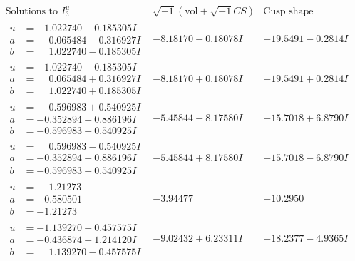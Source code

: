 \documentclass[1p]{elsarticle_modified}
\theoremstyle{definition}
\newcommand{\I}{\sqrt{-1}}
\begin{document}
$$\begin{array}{c|c|c}  
\text{Solutions to }I^u_{3}& \I (\text{vol} + \sqrt{-1}CS) & \text{Cusp shape}\\
 \hline 
\begin{aligned}
u &= -1.022740 + 0.185305 I \\
a &= \phantom{-}0.065484 - 0.316927 I \\
b &= \phantom{-}1.022740 - 0.185305 I\end{aligned}
 & -8.18170 - 0.18078 I & -19.5491 - 0.2814 I \\ \hline\begin{aligned}
u &= -1.022740 - 0.185305 I \\
a &= \phantom{-}0.065484 + 0.316927 I \\
b &= \phantom{-}1.022740 + 0.185305 I\end{aligned}
 & -8.18170 + 0.18078 I & -19.5491 + 0.2814 I \\ \hline\begin{aligned}
u &= \phantom{-}0.596983 + 0.540925 I \\
a &= -0.352894 - 0.886196 I \\
b &= -0.596983 - 0.540925 I\end{aligned}
 & -5.45844 - 8.17580 I & -15.7018 + 6.8790 I \\ \hline\begin{aligned}
u &= \phantom{-}0.596983 - 0.540925 I \\
a &= -0.352894 + 0.886196 I \\
b &= -0.596983 + 0.540925 I\end{aligned}
 & -5.45844 + 8.17580 I & -15.7018 - 6.8790 I \\ \hline\begin{aligned}
u &= \phantom{-}1.21273\phantom{ +0.000000I} \\
a &= -0.580501\phantom{ +0.000000I} \\
b &= -1.21273\phantom{ +0.000000I}\end{aligned}
 & -3.94477\phantom{ +0.000000I} & -10.2950\phantom{ +0.000000I} \\ \hline\begin{aligned}
u &= -1.139270 + 0.457575 I \\
a &= -0.436874 + 1.214120 I \\
b &= \phantom{-}1.139270 - 0.457575 I\end{aligned}
 & -9.02432 + 6.23311 I & -18.2377 - 4.9365 I \\ \hline\begin{aligned}

\end{aligned}
\end{array}$$
\end{document}
